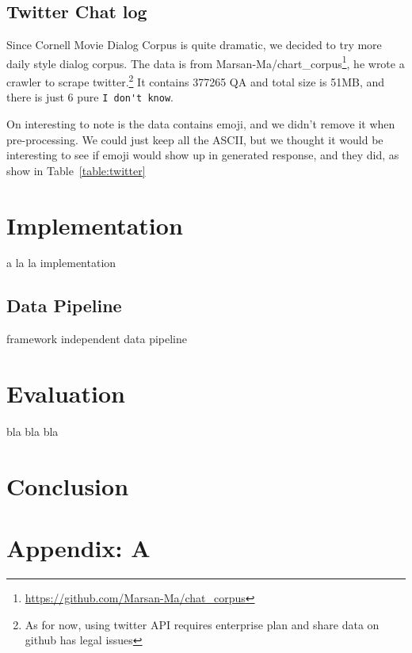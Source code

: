 \documentclass{article}
\begin{document}
\subsection{Twitter Chat log}
\label{subsec:twitter}

Since Cornell Movie Dialog Corpus is quite dramatic, we decided to try more daily style dialog corpus.
The data is from Marsan-Ma/chart\_corpus\footnote{\url{https://github.com/Marsan-Ma/chat\_corpus}}, he wrote
a crawler to scrape twitter.\footnote{As for now, using twitter API requires enterprise plan and share data on github has legal issues}
It contains 377265 QA and total size is 51MB, and there is just 6 pure \verb+I don't know+.

On interesting to note is the data contains emoji, and we didn't remove it when pre-processing.
We could just keep all the ASCII, but we thought it would be interesting to see if emoji would show up in generated response, and they did, as show in Table~\ref{table:twitter}


\section{Implementation}
\label{sec:implementation}

a la la implementation

\subsection{Data Pipeline}
\label{subsec:data-pipeline}

framework independent data pipeline

\section{Evaluation}
\label{sec:evaluation}
bla bla bla

\section{Conclusion}
\label{sec:conclusion}

\printbibliography

\section*{Appendix: A}
\label{sec:appendix:a}
\end{document}
